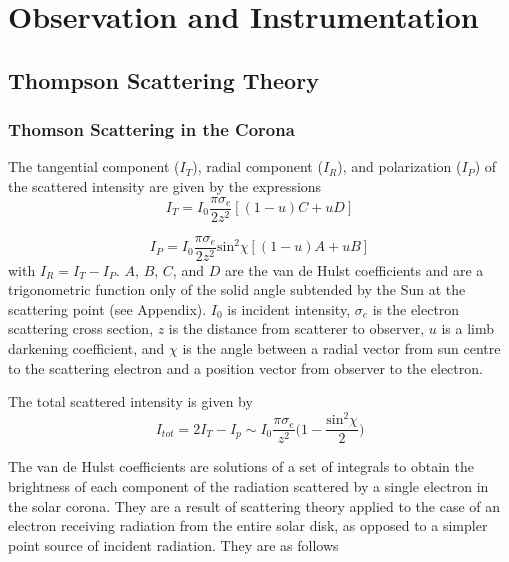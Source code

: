 

\chapter{Observation and Instrumentation} 
\label{chap:3}

\section{Thompson Scattering Theory}\label{sec:1}

\subsection{Thomson Scattering in the Corona}\label{sec:10}

The tangential component ($I_T$), radial component ($I_R$), and polarization ($I_P$) of the scattered intensity are given by the expressions
\begin{equation}
I_T=I_0\frac{\pi \sigma_e}{2z^2}[(1-u)C +uD]
\end{equation}

\begin{equation}
I_P=I_0\frac{\pi \sigma_e}{2z^2}\mathrm{sin}^2\chi[(1-u)A +uB]
\end{equation}
with $I_R = I_T-I_P$. $A$, $B$, $C$, and $D$ are the van de Hulst coefficients and are a trigonometric function only of the solid angle subtended by the Sun at the scattering point (see Appendix). $I_0$ is incident intensity, $\sigma_e$ is the electron scattering cross section, $z$ is the distance from scatterer to observer, $u$ is a limb darkening coefficient, and $\chi$ is the angle between a radial vector from sun centre to the scattering electron and a position vector from observer to the electron. 

The total scattered intensity is given by
\begin{equation}
I_{tot} =  2I_T - I_p \sim I_0\frac{\pi \sigma_e}{z^2}\bigg(1 - \frac{\mathrm{sin}^2\chi}{2}\bigg)
\end{equation}




The van de Hulst coefficients are solutions of a set of integrals to obtain the brightness of each component of the radiation scattered by a single electron in the solar corona. They are a result of scattering theory applied to the case of an electron receiving radiation from the entire solar disk, as opposed to a simpler point source of incident radiation. They are as follows


